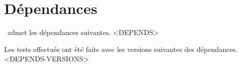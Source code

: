\documentclass{main}
\begin{document}
\section{Dépendances}

\thisproj\ admet les dépendances suivantes.
<DEPENDS>

\begin{tdocnote}
    Les tests effectués ont été faits avec les versions suivantes des dépendances.
    <DEPENDS-VERSIONS>
\end{tdocnote}
\end{document}
